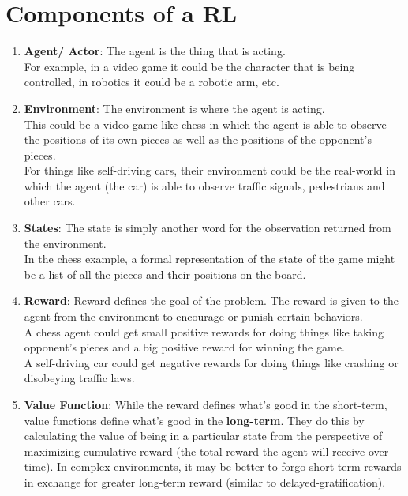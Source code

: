 \section{Components of a RL \cite{medium-numsmt2-rl-ch1-part-1}}\label{Components of a RL}
\begin{enumerate}[itemsep=5pt]
    \item \textbf{Agent/ Actor}: The agent is the thing that is acting.\\ For example, in a video game it could be the character that is being controlled, in robotics it could be a robotic arm, etc.
    
    \item \textbf{Environment}: The environment is where the agent is acting. \\ This could be a video game like chess in which the agent is able to observe the positions of its own pieces as well as the positions of the opponent’s pieces. \\ For things like self-driving cars, their environment could be the real-world in which the agent (the car) is able to observe traffic signals, pedestrians and other cars.
    
    \item \textbf{States}: The state is simply another word for the observation returned from the environment. \\ In the chess example, a formal representation of the state of the game might be a list of all the pieces and their positions on the board.
    
    \item \textbf{Reward}: Reward defines the goal of the problem. The reward is given to the agent from the environment to encourage or punish certain behaviors. \\ A chess agent could get small positive rewards for doing things like taking opponent’s pieces and a big positive reward for winning the game. \\ A self-driving car could get negative rewards for doing things like crashing or disobeying traffic laws.

    \item \textbf{Value Function}: While the reward defines what’s good in the short-term, value functions define what’s good in the \textbf{long-term}. They do this by calculating the value of being in a particular state from the perspective of maximizing cumulative reward (the total reward the agent will receive over time). In complex environments, it may be better to forgo short-term rewards in exchange for greater long-term reward (similar to delayed-gratification).


\end{enumerate}
